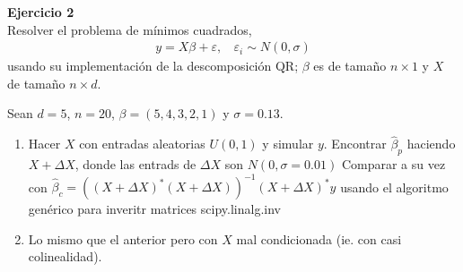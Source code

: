 \documentclass[a4paper, 11pt]{article}
\newenvironment{problem}[2][Ejercicio]
{ \begin{mdframed}[backgroundcolor= red!50] \textbf{#1 #2} \\}
	{  \end{mdframed}}
\begin{document}
\begin{problem}{2}
    Resolver el problema de mínimos cuadrados, 
    \begin{align*}
        y = X\beta + \varepsilon, \:\:\:\: \varepsilon_i \sim N(0,\sigma)
    \end{align*}
    usando su implementación de la descomposición QR; $\beta$ es de tamaño $n\times 1$ y $X$ de tamaño $n\times d$.

    Sean $d =5 $, $n =20$, $\beta= (5,4,3,2,1)$ y $\sigma = 0.13$.
    \begin{enumerate}
        \item Hacer $X$ con entradas aleatorias $U(0,1)$ y simular $y$. Encontrar $\hat{\beta}_p$ haciendo $X + \Delta X $, donde las entrads de $\Delta X$ son $N(0,\sigma = 0.01)$ Comparar a su vez con $\hat{\beta}_c = ((X + \Delta X)^*(X + \Delta X))^{-1} (X + \Delta X)^*y $ usando el algoritmo genérico para inveritr matrices scipy.linalg.inv
        \item Lo mismo que el anterior pero con $X$ mal condicionada (ie. con casi colinealidad).
    \end{enumerate}
\end{problem}
\end{document}
